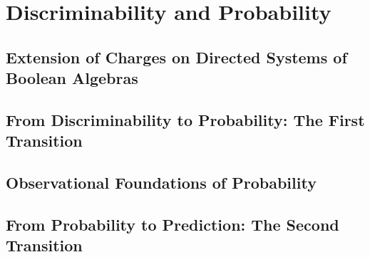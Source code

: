 \documentclass[12pt, oneside]{book}
\theoremstyle{definition}
\theoremstyle{remark}
\begin{document}
\mainmatter

\part{Discriminability and Probability}


\chapter[Extension of Charges on Directed Systems]{Extension of Charges on Directed Systems of Boolean Algebras}
\label{chap:paper-minus-one}




\chapter*{From Discriminability to Probability: The First Transition}
\label{interstitial:minus-one-to-zero}




\chapter{Observational Foundations of Probability}
\label{chap:paper-zero}




\chapter*{From Probability to Prediction: The Second Transition}
\label{interstitial:zero-to-one}
\end{document}
